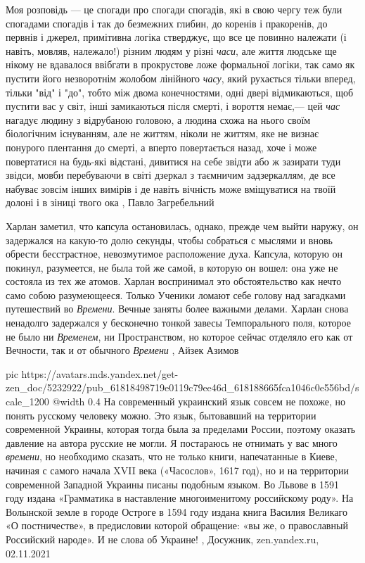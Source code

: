Моя розповідь — це спогади про спогади спогадів, які в свою чергу теж були
спогадами спогадів і так до безмежних глибин, до коренів і пракоренів, до
первнів і джерел, примітивна логіка стверджує, що все це повинно належати (і
навіть, мовляв, належало!) різним людям у різні \emph{часи}, але життя людське ще
нікому не вдавалося ввібгати в прокрустове ложе формальної логіки, так само як
пустити його незворотнім жолобом лінійного \emph{часу}, який рухається тільки вперед,
тільки "від" і "до", тобто між двома конечностями, одні двері відмикаються, щоб
пустити вас у світ, інші замикаються після смерті, і вороття немає,— цей \emph{час}
нагадує людину з відрубаною головою, а людина схожа на нього своїм біологічним
існуванням, але не життям, ніколи не життям, яке не визнає понурого плентання
до смерті, а вперто повертається назад, хоче і може повертатися на будь-які
відстані, дивитися на себе звідти або ж зазирати туди звідси, мовби перебуваючи
в світі дзеркал з таємничим задзеркаллям, де все набуває зовсім інших вимірів і
де навіть вічність може вміщуватися на твоїй долоні і в зіниці твого ока
, Павло Загребельний 

Харлан заметил, что капсула остановилась, однако, прежде чем выйти наружу, он
задержался на какую-то долю секунды, чтобы собраться с мыслями и вновь обрести
бесстрастное, невозмутимое расположение духа. Капсула, которую он покинул,
разумеется, не была той же самой, в которую он вошел: она уже не состояла из
тех же атомов. Харлан воспринимал это обстоятельство как нечто само собою
разумеющееся. Только Ученики ломают себе голову над загадками путешествий во
\emph{Времени}. Вечные заняты более важными делами.  Харлан снова ненадолго
задержался у бесконечно тонкой завесы Темпорального поля, которое не было ни
\emph{Временем}, ни Пространством, но которое сейчас отделяло его как от Вечности, так
и от обычного \emph{Времени}
, Айзек Азимов

\ifcmt
  pic https://avatars.mds.yandex.net/get-zen_doc/5232922/pub_61818498719e0119c79ee46d_618188665fca1046c0e556bd/scale_1200
  @width 0.4
\fi
На современный украинский язык совсем не похоже, но понять русскому человеку
можно. Это язык, бытовавший на территории современной Украины, которая тогда
была за пределами России, поэтому оказать давление на автора русские не могли.
Я постараюсь не отнимать у вас много \emph{времени}, но необходимо сказать, что
не только книги, напечатанные в Киеве, начиная с самого начала XVII века
(«Часослов», 1617 год), но и на территории современной Западной Украины писаны
подобным языком. Во Львове в 1591 году издана «Грамматика в наставление
многоименитому российскому роду». На Волынской земле в городе Остроге в 1594
году издана книга Василия Великаго «О постничестве», в предисловии которой
обращение: «вы же, о православный Российский народе». И не слова об Украине!
, Досужник, zen.yandex.ru, 02.11.2021
